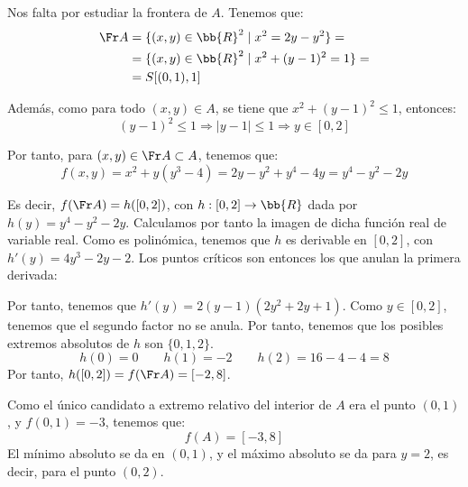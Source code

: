 \begin{ejercicio}
    Nos falta por estudiar la frontera de $A$. Tenemos que:
    \begin{equation*}
        \begin{split}
            \Fr A &= \{(x,y)\in \bb{R}^2\mid x^2= 2y-y^2\}
            =\\
            &= \{(x,y)\in \bb{R}^2\mid x^2 + (y-1)^2= 1\} =\\
            &= S[(0,1),1]
        \end{split}
    \end{equation*}

    Además, como para todo $(x,y)\in A$, se tiene que $x^2 + (y-1)^2\leq 1$, entonces:
    \begin{equation*}
        (y-1)^2\leq 1 \Longrightarrow |y-1|\leq 1 \Longrightarrow y\in [0,2]
    \end{equation*}
    
    Por tanto, para $(x,y)\in \Fr A\subset A$, tenemos que:
    \begin{equation*}
        f(x,y) = x^2+y(y^3-4) = 2y-y^2 + y^4-4y = y^4-y^2-2y
    \end{equation*}

    Es decir, $f(\Fr A)=h([0,2])$, con $h:[0,2]\to \bb{R}$ dada por $h(y)=y^4-y^2-2y$. Calculamos por tanto la imagen de dicha función real de variable real. Como es polinómica, tenemos que $h$ es derivable en $[0,2]$, con $h'(y)=4y^3-2y-2$. Los puntos críticos son entonces los que anulan la primera derivada:
    \begin{figure}[H]
        \centering
    \end{figure}
    Por tanto, tenemos que $h'(y)=2(y-1)(2y^2+2y+1)$. Como $y\in [0,2]$, tenemos que el segundo factor no se anula. Por tanto, tenemos que los posibles extremos absolutos de $h$ son $\{0,1,2\}$.
    \begin{equation*}
        h(0)=0 \qquad h(1)=-2 \qquad h(2)=16-4-4 = 8
    \end{equation*}
    Por tanto, $h([0,2])=f(\Fr A) = [-2,8]$.

    Como el único candidato a extremo relativo del interior de $A$ era el punto $(0,1)$, y $f(0,1)=-3$, tenemos que:
    \begin{equation*}
        f(A)=[-3,8]
    \end{equation*}
    El mínimo absoluto se da en $(0,1)$, y el máximo absoluto se da para $y=2$, es decir, para el punto $(0,2)$.
\end{ejercicio}








